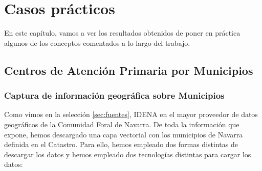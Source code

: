 \chapter*{Casos prácticos}
\setcounter{chapter}{6} 
\setcounter{section}{0}
En este capítulo, vamos a ver los resultados obtenidos de poner en práctica algunos de los conceptos comentados a lo largo del trabajo.

\section{Centros de Atención Primaria por Municipios}

\subsection{Captura de información geográfica sobre Municipios}
Como vimos en la selección \ref{sec:fuentes}, IDENA en el mayor proveedor de datos geográficos de la Comunidad Foral de Navarra.
De toda la información que expone, hemos descargado una capa vectorial con los municipios de Navarra definida en el Catastro.
Para ello, hemos empleado dos formas distintas de descargar los datos y hemos empleado dos tecnologías distintas para cargar los datos:
